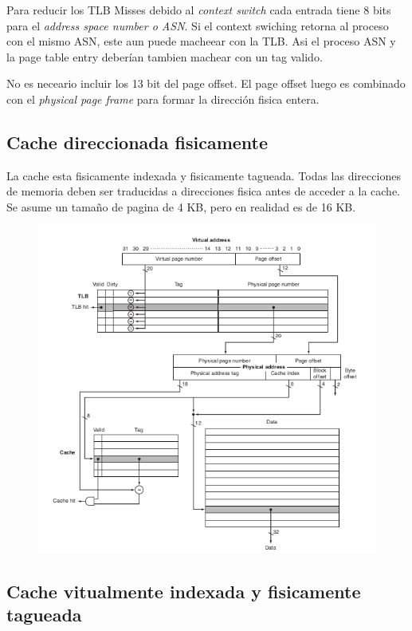\documentclass{article}
\begin{document}
Para reducir los TLB Misses debido al \textit{context switch} cada entrada tiene 8 bits para el \textit{address space number o ASN}. Si el context swiching retorna al proceso con el mismo ASN, este aun puede macheear con la TLB. Asi el proceso ASN y la page table entry deberían tambien machear con un tag valido.

No es neceario incluir los 13 bit del page offset. El page offset luego es combinado con el \textit{physical page frame} para formar la dirección fisica entera.


\newpage
\subsection{Cache direccionada fisicamente}

La cache esta fisicamente indexada y fisicamente tagueada. Todas las direcciones de memoria deben ser traducidas a direcciones fisica antes de acceder a la cache.
Se asume un tamaño de pagina de 4 KB, pero en realidad es de 16 KB. 

\begin{figure}[h!]
    \includegraphics[width=\linewidth]{imagenes/CacheDireccionamientoFisico.png}
\end{figure}

\newpage
\subsection{Cache vitualmente indexada y fisicamente tagueada}
\end{document}

